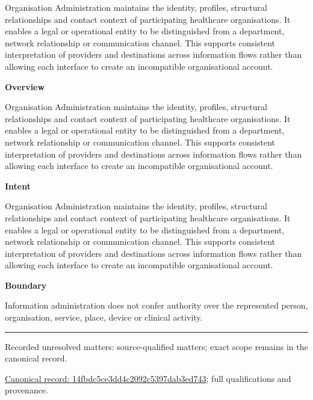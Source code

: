Organisation Administration maintains the identity, profiles, structural relationships and contact context of participating healthcare organisations. It enables a legal or operational entity to be distinguished from a department, network relationship or communication channel. This supports consistent interpretation of providers and destinations across information flows rather than allowing each interface to create an incompatible organisational account.



\textbf{Overview}



Organisation Administration maintains the identity, profiles, structural relationships and contact context of participating healthcare organisations. It enables a legal or operational entity to be distinguished from a department, network relationship or communication channel. This supports consistent interpretation of providers and destinations across information flows rather than allowing each interface to create an incompatible organisational account.



\textbf{Intent}



Organisation Administration maintains the identity, profiles, structural relationships and contact context of participating healthcare organisations. It enables a legal or operational entity to be distinguished from a department, network relationship or communication channel. This supports consistent interpretation of providers and destinations across information flows rather than allowing each interface to create an incompatible organisational account.



\textbf{Boundary}



Information administration does not confer authority over the represented person, organisation, service, place, device or clinical activity.



\medskip\hrule\medskip

{\small Recorded unresolved matters: source-qualified matters; exact scope remains in the canonical record.}\par
{\footnotesize \href{../../../../../../../continuum/strategy/capability/14fbdc5ce3dd4c2092c5397dab3ed743.md}{Canonical record: 14fbdc5ce3dd4c2092c5397dab3ed743}; full qualifications and provenance.}\par
